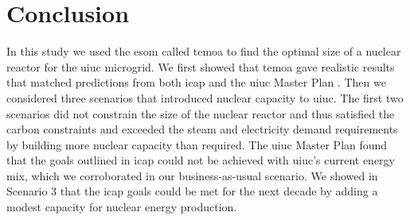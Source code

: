 \section{Conclusion}

In this study we used the \gls{esom} called \gls{temoa} to find the optimal
size of a nuclear reactor for the \gls{uiuc} microgrid. We first showed that
\gls{temoa} gave realistic results that matched predictions from both \gls{icap}
and the \gls{uiuc} Master Plan \cite{isee_illinois_2015, affiliated_engineers_inc_utilities_2015}.
Then we considered three scenarios that introduced nuclear capacity to
\gls{uiuc}. The first two scenarios did not constrain the size of the nuclear
reactor and thus satisfied the carbon constraints and exceeded the steam
and electricity demand requirements by building more nuclear capacity than
required.
The \gls{uiuc} Master Plan found that the goals outlined in \gls{icap} could
not be achieved with \gls{uiuc}'s current energy mix, which we corroborated in
our business-as-usual scenario. We showed in Scenario 3 that the \gls{icap}
goals could be met for the next decade by adding a modest capacity for nuclear
energy production.
